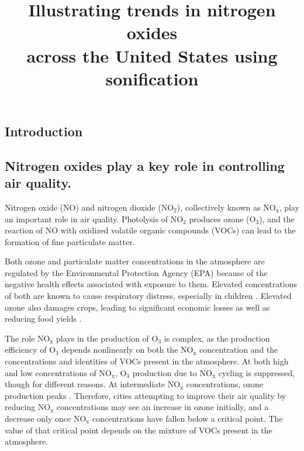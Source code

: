 \documentclass[a4paper,10pt,oneside]{article}
\title{Illustrating trends in nitrogen oxides \\across the United States using sonification}
\newcommand{\ce}[1]{$\mathrm{#1}$}
\begin{document}
\ninept
\maketitle

\begin{sloppy}

\begin{abstract}

\end{abstract}

\section{Introduction}
\label{sec:intro}

\subsection{Nitrogen oxides play a key role in controlling air quality.}
\label{sec:nox-chemistry}
Nitrogen oxide (\ce{NO}) and nitrogen dioxide (\ce{NO_2}), collectively known as \ce{NO_x}, play an important role in air quality.  Photolysis of \ce{NO_2} produces ozone (\ce{O_3}), and the reaction of \ce{NO} with oxidized volatile organic compounds (VOCs) can lead to the formation of fine particulate matter.

Both ozone and particulate matter concentrations in the atmosphere are regulated by the Environmental Protection Agency (EPA) because of the negative health effects associated with exposure to them. Elevated concentrations of both are known to cause respiratory distress, especially in children \cite{romieu96}. Elevated ozone also damages crops, leading to significant economic losses as well as reducing food yields \cite{tai14}.

The role \ce{NO_x} plays in the production of \ce{O_3} is complex, as the production efficiency of \ce{O_3} depends nonlinearly on both the \ce{NO_x} concentration and the concentrations and identities of VOCs present in the atmosphere. At both high and low concentrations of \ce{NO_x}, \ce{O_3} production due to \ce{NO_x} cycling is suppressed, though for different reasons. At intermediate \ce{NO_x} concentrations, ozone production peaks \cite{murphy07}.  Therefore, cities attempting to improve their air quality by reducing \ce{NO_x} concentrations may see an increase in ozone initially, and a decrease only once \ce{NO_x} concentrations have fallen below a critical point. The value of that critical point depends on the mixture of VOCs present in the atmosphere.


\end{sloppy}
\end{document}
